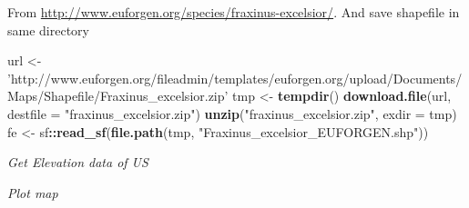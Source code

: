 \documentclass[author-year, review, 11pt]{components/elsarticle} %
\newenvironment{Shaded}{\begin{snugshade}}{\end{snugshade}}
\newcommand{\KeywordTok}[1]{\textcolor[rgb]{0.13,0.29,0.53}{\textbf{#1}}}
\newcommand{\DataTypeTok}[1]{\textcolor[rgb]{0.13,0.29,0.53}{#1}}
\newcommand{\StringTok}[1]{\textcolor[rgb]{0.31,0.60,0.02}{#1}}
\newcommand{\OperatorTok}[1]{\textcolor[rgb]{0.81,0.36,0.00}{\textbf{#1}}}
\newcommand{\NormalTok}[1]{#1}
\begin{document}
From \url{http://www.euforgen.org/species/fraxinus-excelsior/}. And save
shapefile in same directory

\begin{Shaded}
\begin{Highlighting}[]
\NormalTok{url <-}\StringTok{ 'http://www.euforgen.org/fileadmin/templates/euforgen.org/upload/Documents/Maps/Shapefile/Fraxinus_excelsior.zip'}
\NormalTok{tmp <-}\StringTok{ }\KeywordTok{tempdir}\NormalTok{()}
\KeywordTok{download.file}\NormalTok{(url, }\DataTypeTok{destfile =} \StringTok{"fraxinus_excelsior.zip"}\NormalTok{)}
\KeywordTok{unzip}\NormalTok{(}\StringTok{"fraxinus_excelsior.zip"}\NormalTok{, }\DataTypeTok{exdir =}\NormalTok{ tmp)}
\NormalTok{fe <-}\StringTok{ }\NormalTok{sf}\OperatorTok{::}\KeywordTok{read_sf}\NormalTok{(}\KeywordTok{file.path}\NormalTok{(tmp, }\StringTok{"Fraxinus_excelsior_EUFORGEN.shp"}\NormalTok{))}
\end{Highlighting}
\end{Shaded}

\emph{Get Elevation data of US}

\begin{Shaded}
\end{Shaded}

\emph{Plot map}
\end{document}
